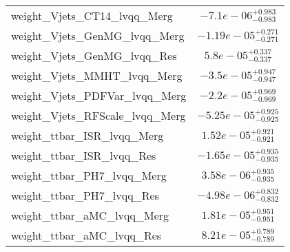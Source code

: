 \begin{tabular}{|l|c|}
weight\_Vjets\_CT14\_lvqq\_Merg & $-7.1e-06^{+0.983}_{-0.983}$ \\
weight\_Vjets\_GenMG\_lvqq\_Merg & $-1.19e-05^{+0.271}_{-0.271}$ \\
weight\_Vjets\_GenMG\_lvqq\_Res & $5.8e-05^{+0.337}_{-0.337}$ \\
weight\_Vjets\_MMHT\_lvqq\_Merg & $-3.5e-05^{+0.947}_{-0.947}$ \\
weight\_Vjets\_PDFVar\_lvqq\_Merg & $-2.2e-05^{+0.969}_{-0.969}$ \\
weight\_Vjets\_RFScale\_lvqq\_Merg & $-5.25e-05^{+0.925}_{-0.925}$ \\
weight\_ttbar\_ISR\_lvqq\_Merg & $1.52e-05^{+0.921}_{-0.921}$ \\
weight\_ttbar\_ISR\_lvqq\_Res & $-1.65e-05^{+0.935}_{-0.935}$ \\
weight\_ttbar\_PH7\_lvqq\_Merg & $3.58e-06^{+0.935}_{-0.935}$ \\
weight\_ttbar\_PH7\_lvqq\_Res & $-4.98e-06^{+0.832}_{-0.832}$ \\
weight\_ttbar\_aMC\_lvqq\_Merg & $1.81e-05^{+0.951}_{-0.951}$ \\
weight\_ttbar\_aMC\_lvqq\_Res & $8.21e-05^{+0.789}_{-0.789}$ \\
\hline
\end{tabular}
